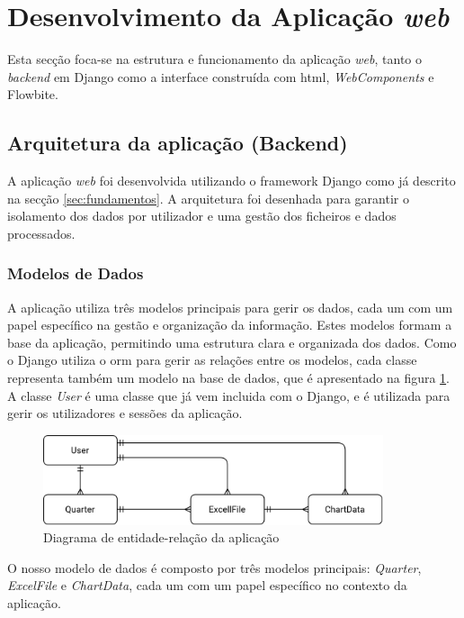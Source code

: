 \section{Desenvolvimento da Aplicação \textit{web}}

Esta secção foca-se na estrutura e funcionamento da aplicação \textit{web}, tanto o \textit{backend} em Django como a interface construída com \gls{html}, \textit{WebComponents} e Flowbite.

\subsection{Arquitetura da aplicação (Backend)}

A aplicação \textit{web} foi desenvolvida utilizando o framework Django como já descrito na secção \ref{sec:fundamentos}. A arquitetura foi desenhada para garantir o isolamento dos dados por utilizador e uma gestão dos ficheiros e dados processados.

\subsubsection{Modelos de Dados}

A aplicação utiliza três modelos principais para gerir os dados, cada um com um papel específico na gestão e organização da informação. Estes modelos formam a base da aplicação, permitindo uma estrutura clara e organizada dos dados. Como o Django utiliza o \gls{orm} para gerir as relações entre os modelos, cada classe representa também um modelo na base de dados, que é apresentado na figura \ref{fig:er-diagram}. A classe \textit{User} é uma classe que já vem incluida com o Django, e é utilizada para gerir os utilizadores e sessões da aplicação.

\begin{figure}[H]
    \centering
    \includegraphics[max width=10cm]{./img/er-diagram.png}
 \caption{Diagrama de entidade-relação da aplicação}
 \label{fig:er-diagram}
 \end{figure}


O nosso modelo de dados é composto por três modelos principais: \textit{Quarter}, \textit{ExcelFile} e \textit{ChartData}, cada um com um papel específico no contexto da aplicação.

